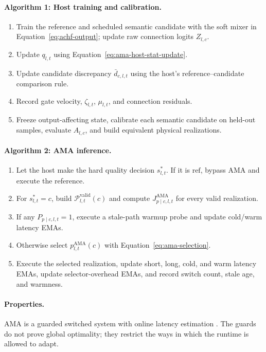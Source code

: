 \documentclass{article}
\newcommand{\ama}{\textsc{AMA}}
\begin{document}
\paragraph{Algorithm 1: Host training and calibration.}
\begin{enumerate}[leftmargin=*]
\item Train the reference and scheduled semantic candidate with the soft mixer
in Equation~\eqref{eq:achf-output}; update raw connection logits $Z_{l,c}$.
\item Update $q_{l,t}$ using Equation~\eqref{eq:ama-host-stat-update}.
\item Update candidate discrepancy $\bar{d}_{c,l,t}$ using the
host's reference--candidate comparison rule.
\item Record gate velocity, $\zeta_{l,t}$, $\mu_{l,t}$, and connection residuals.
\item Freeze output-affecting state, calibrate each semantic candidate on held-out
samples, evaluate $A_{l,c}$, and build equivalent physical realizations.
\end{enumerate}

\paragraph{Algorithm 2: \ama{} inference.}
\begin{enumerate}[leftmargin=*]
\item Let the host make the hard quality decision $s^*_{l,t}$. If it is
$\mathrm{ref}$, bypass \ama{} and execute the reference.
\item For $s^*_{l,t}=c$, build $\mathcal{P}^{\mathrm{valid}}_{l,t}(c)$ and
compute $J^{\mathrm{AMA}}_{p\mid c,l,t}$ for every valid realization.
\item If any $P_{p\mid c,l,t}=1$, execute a stale-path warmup probe and update
cold/warm latency EMAs.
\item Otherwise select $p^{\mathrm{AMA}}_{l,t}(c)$ with
Equation~\eqref{eq:ama-selection}.
\item Execute the selected realization, update short, long, cold, and warm latency
EMAs, update selector-overhead EMAs, and record switch count, stale age, and
warmness.
\end{enumerate}

\paragraph{Properties.}
\ama{} is a guarded switched system with online latency estimation
\cite{liberzon2003switching,astrom2008feedback}. The
guards do not prove global optimality; they restrict the ways in which the
runtime is allowed to adapt.
\end{document}
